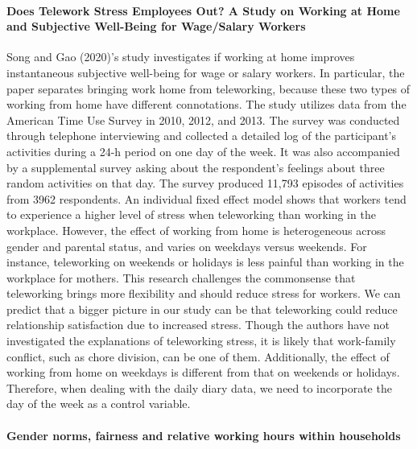 \documentclass[
  english,
  man]{apa6}
\let\oldparagraph\paragraph
\renewcommand{\paragraph}[1]{\oldparagraph{#1}\mbox{}}
\begin{document}
\hypertarget{does-telework-stress-employees-out-a-study-on-working-at-home-and-subjective-well-being-for-wagesalary-workers}{%
\paragraph{Does Telework Stress Employees Out? A Study on Working at Home and Subjective Well-Being for Wage/Salary Workers}\label{does-telework-stress-employees-out-a-study-on-working-at-home-and-subjective-well-being-for-wagesalary-workers}}

Song and Gao (2020)'s study investigates if working at home improves instantaneous subjective well-being for wage or salary workers. In particular, the paper separates bringing work home from teleworking, because these two types of working from home have different connotations. The study utilizes data from the American Time Use Survey in 2010, 2012, and 2013. The survey was conducted through telephone interviewing and collected a detailed log of the participant's activities during a 24-h period on one day of the week. It was also accompanied by a supplemental survey asking about the respondent's feelings about three random activities on that day. The survey produced 11,793 episodes of activities from 3962 respondents. An individual fixed effect model shows that workers tend to experience a higher level of stress when teleworking than working in the workplace. However, the effect of working from home is heterogeneous across gender and parental status, and varies on weekdays versus weekends. For instance, teleworking on weekends or holidays is less painful than working in the workplace for mothers. This research challenges the commonsense that teleworking brings more flexibility and should reduce stress for workers. We can predict that a bigger picture in our study can be that teleworking could reduce relationship satisfaction due to increased stress. Though the authors have not investigated the explanations of teleworking stress, it is likely that work-family conflict, such as chore division, can be one of them. Additionally, the effect of working from home on weekdays is different from that on weekends or holidays. Therefore, when dealing with the daily diary data, we need to incorporate the day of the week as a control variable.

\hypertarget{gender-norms-fairness-and-relative-working-hours-within-households}{%
\paragraph{Gender norms, fairness and relative working hours within households}\label{gender-norms-fairness-and-relative-working-hours-within-households}}
\end{document}

